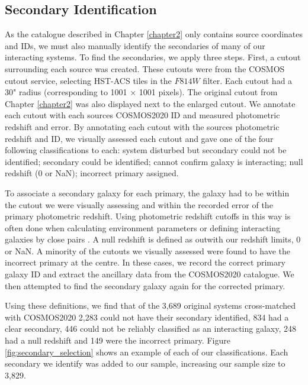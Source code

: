 \subsection{Secondary Identification}\label{sec:sec-ident}
\noindent As the catalogue described in Chapter \ref{chapter2} only contains source coordinates and IDs, we must also manually identify the secondaries of many of our interacting systems. To find the secondaries, we apply three steps. First, a cutout surrounding each source was created. These cutouts were from the COSMOS cutout service, selecting HST-ACS tiles in the $F814W$ filter. Each cutout had a 30" radius (corresponding to 1001 $\times$ 1001 pixels). The original cutout from Chapter \ref{chapter2} was also displayed next to the enlarged cutout. We annotate each cutout with each sources COSMOS2020 ID and measured photometric redshift and error. By annotating each cutout with the sources photometric redshift and ID, we visually assessed each cutout and gave one of the four following classifications to each: system disturbed but secondary could not be identified; secondary could be identified; cannot confirm galaxy is interacting; null redshift (0 or NaN); incorrect primary assigned. 

To associate a secondary galaxy for each primary, the galaxy had to be within the cutout we were visually assessing and within the recorded error of the primary photometric redshift. Using photometric redshift cutoffs in this way is often done when calculating environment parameters \citep[e.g][]{2006MNRAS.373..469B} or defining interacting galaxies by close pairs \citep[e.g][]{2022ApJ...940....4S}. A null redshift is defined as outwith our redshift limits, 0 or NaN. A minority of the cutouts we visually assessed were found to have the incorrect primary at the centre. In these cases, we record the correct primary galaxy ID and extract the ancillary data from the COSMOS2020 catalogue. We then attempted to find the secondary galaxy again for the corrected primary.

Using these definitions, we find that of the 3,689 original systems cross-matched with COSMOS2020 2,283 could not have their secondary identified, 834 had a clear secondary, 446 could not be reliably classified as an interacting galaxy, 248 had a null redshift and 149 were the incorrect primary. Figure \ref{fig:secondary_selection} shows an example of each of our classifications. Each secondary we identify was added to our sample, increasing our sample size to 3,829.

